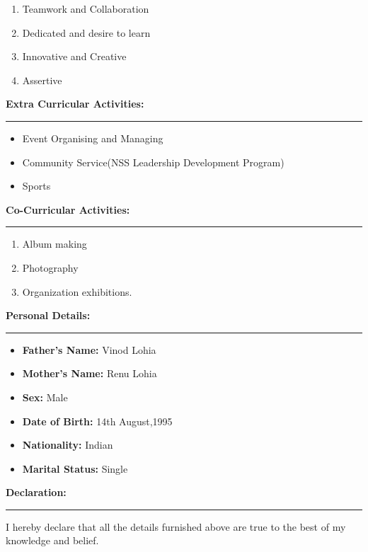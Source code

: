 \documentclass[a4paper,10pt]{article}
\begin{document}
\begin{flushleft}
\begin{enumerate}
    	\item Teamwork and Collaboration\\
    	\item Dedicated and desire to learn\\
    	\item Innovative and Creative\\
    	\item Assertive\\
    \end{enumerate}
    \textbf{\large Extra Curricular Activities:}\\
  \hrule
  \begin{itemize}
  	\item Event Organising and Managing\\
  	\item Community Service(NSS Leadership Development Program)\\
  	\item Sports\\
  \end{itemize}
  
  \textbf{\large Co-Curricular Activities:}\\
  \hrule
  \begin{enumerate}
  	\item Album making\\
  	\item Photography\\
  	\item Organization exhibitions.\\
  \end{enumerate}
  \textbf{\large Personal Details:}\\
   \hrule
    \begin{itemize}
    	\item  \textbf{Father's Name:} Vinod Lohia\\
    	\item  \textbf{Mother's Name:} Renu Lohia\\
    	\item  \textbf{Sex:} Male\\
    	\item  \textbf{Date of Birth:} 14th August,1995\\
    	\item  \textbf{Nationality:}   Indian\\
    	\item  \textbf{Marital Status:}  Single\\
    \end{itemize}
     \textbf{ \large Declaration: }\\
      \hrule
      \bigskip 
     I hereby declare that all the details furnished above are true to the best of my knowledge and belief.
     \medskip
\end{flushleft}
\end{document}

